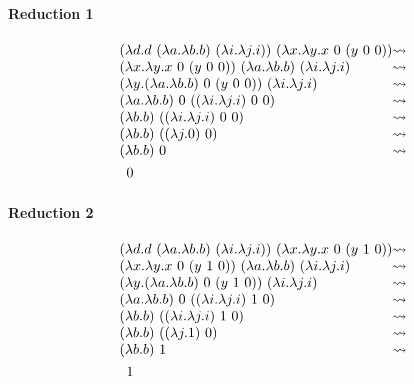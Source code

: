 \documentclass{article}
\newcommand{\N}{\ensuremath \mathbb N}
\newcommand{\lam}[2]{\ensuremath{\lambda#1.#2}}
\begin{document}
\paragraph{Reduction 1}
\begin{align*}
    &\begin{array}{l @{\leadsto} c l}
        (\lam{d}{d\ (\lam{a}\lam{b}{b})\ (\lam{i}\lam{j}{i})})\ (\lam{x}\lam{y}{x\ 0\ (y\ 0\ 0)}) \\
        (\lam{x}\lam{y}{x\ 0\ (y\ 0\ 0)})\ (\lam{a}\lam{b}{b})\ (\lam{i}\lam{j}{i}) \\
        (\lam{y}{(\lam{a}\lam{b}{b})\ 0\ (y\ 0\ 0)})\ (\lam{i}\lam{j}{i}) \\
        (\lam{a}\lam{b}{b})\ 0\ ((\lam{i}\lam{j}{i})\ 0\ 0)\  \\
        (\lam{b}{b})\ ((\lam{i}\lam{j}{i})\ 0\ 0)\  \\
        (\lam{b}{b})\ ((\lam{j}{0})\ 0)\  \\
        (\lam{b}{b})\ 0 \\
    \end{array}\\
    &\quad 0
\end{align*}

\paragraph{Reduction 2}
\begin{align*}
    &\begin{array}{l @{\leadsto} c l}
        (\lam{d}{d\ (\lam{a}\lam{b}{b})\ (\lam{i}\lam{j}{i})})\ (\lam{x}\lam{y}{x\ 0\ (y\ 1\ 0)}) \\
        (\lam{x}\lam{y}{x\ 0\ (y\ 1\ 0)})\ (\lam{a}\lam{b}{b})\ (\lam{i}\lam{j}{i}) \\
        (\lam{y}{(\lam{a}\lam{b}{b})\ 0\ (y\ 1\ 0)})\ (\lam{i}\lam{j}{i}) \\
        (\lam{a}\lam{b}{b})\ 0\ ((\lam{i}\lam{j}{i})\ 1\ 0)\  \\
        (\lam{b}{b})\ ((\lam{i}\lam{j}{i})\ 1\ 0)\  \\
        (\lam{b}{b})\ ((\lam{j}{1})\ 0)\  \\
        (\lam{b}{b})\ 1 \\
    \end{array}\\
    &\quad 1
\end{align*}

\end{document}
